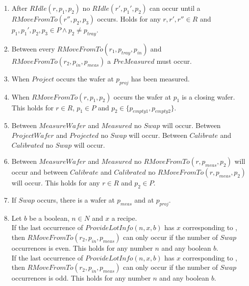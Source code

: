 \begin{enumerate}
    \item After $\mathit{RIdle}(r, p_1, p_2)$ no $\mathit{RIdle}(r', p_1', p_2)$ can occur until a $\mathit{RMoveFromTo}(r'',p_2,p_3)$ occurs.
    Holds for any $r,r',r''\in R$ and $p_1,p_1',p_2,p_3 \in P \wedge p_2 \neq p_\mathit{tray}$.

    \item Between every $\mathit{RMoveFromTo}(r_1, p_\mathit{tray},p_\mathit{in})$ and $\mathit{RMoveFromTo}(r_2, p_\mathit{in}, p_\mathit{meas})$ a $\mathit{PreMeasured}$ must occur.

    \item When $\mathit{Project}$ occurs the wafer at $p_\mathit{proj}$ has been measured.

    \item When $\mathit{RMoveFromTo}(r, p_1, p_2)$ occurs the wafer at $p_1$ is a closing wafer.
    This holds for $r \in R$, $p_1 \in P$ and $p_2 \in \{p_\textit{empty1}, p_\textit{empty2}\}$.
    
    \item Between $\mathit{MeasureWafer}$ and $\mathit{Measured}$ no $\mathit{Swap}$ will occur.
    Between $\mathit{ProjectWafer}$ and $\mathit{Projected}$ no $\mathit{Swap}$ will occur.
    Between $\mathit{Calibrate}$ and $\mathit{Calibrated}$ no $\mathit{Swap}$ will occur.

    \item Between $\mathit{MeasureWafer}$ and $\mathit{Measured}$ no $\mathit{RMoveFromTo}(r, p_\mathit{meas}, p_2)$ will occur and between $\mathit{Calibrate}$ and $\mathit{Calibrated}$ no $\mathit{RMoveFromTo}(r, p_\mathit{meas}, p_2)$ will occur.
    This holds for any $r \in R$ and $p_2 \in P$.
    
    \item If $\mathit{Swap}$ occurs, there is a wafer at $p_\mathit{meas}$ and at $p_\mathit{proj}$.

    \item Let $b$ be a boolean, $n \in N$ and $x$ a recipe.  \\
        If the last occurrence of $\mathit{ProvideLotInfo}(n, x, b)$ has $x$ corresponding to \recipeOne, then $\mathit{RMoveFromTo}(r_2,p_\mathit{in},p_\mathit{meas})$ can only occur if the number of $\mathit{Swap}$ occurrences is even.
        This holds for any number $n$ and any boolean $b$. \\
        If the last occurrence of $\mathit{ProvideLotInfo}(n, x, b)$ has $x$ corresponding to \recipeTwo, then $\mathit{RMoveFromTo}(r_2,p_\mathit{in},p_\mathit{meas})$ can only occur if the number of $\mathit{Swap}$ occurrences is odd.
        This holds for any number $n$ and any boolean $b$. \\


\end{enumerate}
